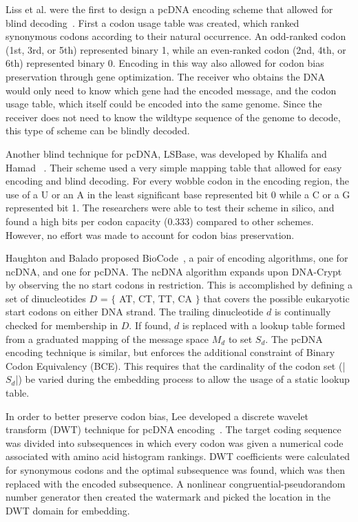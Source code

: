 \documentclass{bioinfo}
\begin{document}
Liss et al. were the first to design a pcDNA encoding scheme that allowed for blind decoding~\cite{LDBKHLW2012PO}. First a codon usage table was created, which ranked synonymous codons according to their natural occurrence. An odd-ranked codon (1st, 3rd, or 5th) represented binary 1, while an even-ranked codon (2nd, 4th, or 6th) represented binary 0. Encoding in this way also allowed for codon bias preservation through gene optimization. The receiver who obtains the DNA would only need to know which gene had the encoded message, and the codon usage table, which itself could be encoded into the same genome. Since the receiver does not need to know the wildtype sequence of the genome to decode, this type of scheme can be blindly decoded.

Another blind technique for pcDNA, LSBase, was developed by Khalifa and Hamad ~\cite{KH2015BJOMACS}. Their scheme used a very simple mapping table that allowed for easy encoding and blind decoding. For every wobble codon in the encoding region, the use of a U or an A in the least significant base represented bit 0 while a C or a G represented bit 1. The researchers were able to test their scheme in silico, and found a high bits per codon capacity (0.333) compared to other schemes. However, no effort was made to account for codon bias preservation.

Haughton and Balado proposed BioCode~\cite{HBBMC2013}, a pair of encoding algorithms, one for ncDNA, and one for pcDNA. The ncDNA algorithm expands upon DNA-Crypt by observing the no start codons in restriction. This is accomplished by defining a set of dinucleotides $D$ = $\{$ AT, CT, TT, CA $\}$ that covers the possible eukaryotic start codons on either DNA strand. The trailing dinucleotide $d$ is continually checked for membership in $D$. If found, $d$ is replaced with a lookup table formed from a graduated mapping of the message space $M_d$ to set $S_d$. The pcDNA encoding technique is similar, but enforces the additional constraint of Binary Codon Equivalency (BCE). This requires that the cardinality of the codon set (|$S_d$|) be varied during the embedding process to allow the usage of a static lookup table.

In order to better preserve codon bias, Lee developed a discrete wavelet transform (DWT) technique for pcDNA encoding~\cite{L2014IS}. The target coding sequence was divided into subsequences in which every codon was given a numerical code associated with amino acid histogram rankings. DWT coefficients were calculated for synonymous codons and the optimal subsequence was found, which was then replaced with the encoded subsequence. A nonlinear congruential-pseudorandom number generator then created the watermark and picked the location in the DWT domain for embedding.
\end{document}
